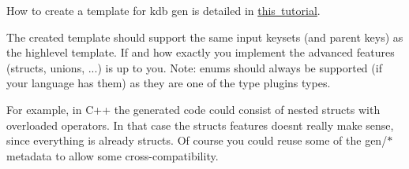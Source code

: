 How to create a template for {\ttfamily kdb gen} is detailed in \mbox{\hyperlink{doc_tutorials_code-generator_md}{this tutorial}}.

The created template should support the same input keysets (and parent keys) as the {\ttfamily highlevel} template. If and how exactly you implement the advanced features (structs, unions, ...) is up to you. Note\+: enums should always be supported (if your language has them) as they are one of the {\ttfamily type} plugins types.

For example, in C++ the generated code could consist of nested structs with overloaded operators. In that case the structs features doesn\textquotesingle{}t really make sense, since everything is already structs. Of course you could reuse some of the {\ttfamily gen/$\ast$} metadata to allow some cross-\/compatibility. 